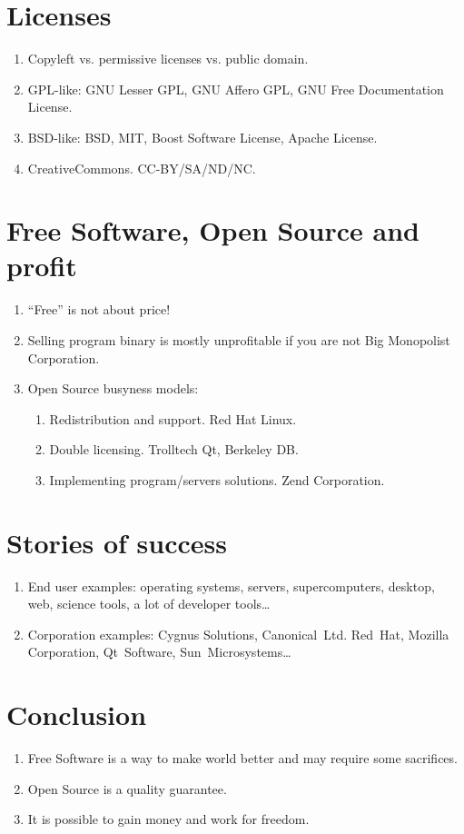 \documentclass[10pt,a4paper]{proc}
\newcommand{\bee}{\begin{enumerate}\setlength{\itemsep}{-0.7mm}}
\newcommand{\ene}{\end{enumerate}}
\begin{document}
\section{Licenses}
\bee
  \item Copyleft vs. permissive licenses vs. public domain.
  \item GPL-like: GNU Lesser GPL, GNU Affero GPL, GNU Free Documentation License.
  \item BSD-like: BSD, MIT, Boost Software License, Apache License.
  \item CreativeCommons. CC-BY/SA/ND/NC.
\ene

\section{Free Software, Open Source and profit}
\bee
  \item ``Free'' is not about price!
  \item Selling program binary is mostly unprofitable if you are not Big Monopolist Corporation.
  \item Open Source busyness models:
  \bee
    \item Redistribution and support. Red Hat Linux.
    \item Double licensing. Trolltech Qt, Berkeley DB.
    \item Implementing program/servers solutions. Zend Corporation.
  \ene
\ene

\section{Stories of success}
\bee
  \item End user examples: operating systems, servers, supercomputers, desktop, web, science tools, 
a lot of developer tools\dots
  \item Corporation examples: Cygnus Solutions, Canonical~Ltd. Red~Hat, Mozilla Corporation, Qt~Software, 
Sun~Microsystems\dots
\ene

\section{Conclusion}
\bee
  \item Free Software is a way to make world better and may require some 
sacrifices.
  \item Open Source is a quality guarantee.
  \item It is possible to gain money and work for freedom.
\ene
\end{document}
